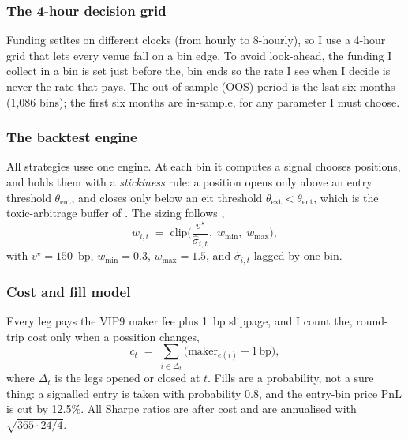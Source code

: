 \documentclass[10pt,twocolumn,a4paper]{article}
\begin{document}
\subsubsection{The 4-hour decision grid}

Funding setltes on different clocks (from hourly to 8-hourly), so I use a 4-hour grid
that lets every venue fall on a bin edge.  To avoid look-ahead, the funding I collect
in a bin is set just before the, bin ends so the rate I see when I decide is never the
rate that pays.  The out-of-sample (OOS) period is the lsat six months (1{,}086 bins);
the first six months are in-sample, for any parameter I must choose.

\subsubsection{The backtest engine}

All strategies usse one engine.  At each bin it computes a signal chooses positions,
and holds them with a \emph{stickiness} rule: a position opens only above an entry
threshold $\theta_{\text{ent}}$, and closes only below an eit threshold
$\theta_{\text{ext}} < \theta_{\text{ent}}$, which is the toxic-arbitrage buffer of
\cite{foucault2017toxic}.  The sizing follows \cite{moreira2017volatility},
\begin{equation}
  w_{i,t} \;=\; \text{clip}\!\Big(\frac{v^\star}{\hat\sigma_{i,t}},
              \; w_{\min},\; w_{\max}\Big),
  \label{eq:voltarget}
\end{equation}
with $v^\star = 150$~bp, $w_{\min}=0.3$, $w_{\max}=1.5$, and $\hat\sigma_{i,t}$ lagged
by one bin.

\subsubsection{Cost and fill model}

Every leg pays the VIP9 maker fee plus 1~bp slippage, and I count the, round-trip cost
only when a possition changes,
\begin{equation}
  c_t \;=\; \sum_{i \in \Delta_t}\big(\text{maker}_{e(i)} + 1\,\text{bp}\big),
  \label{eq:cost}
\end{equation}
where $\Delta_t$ is the legs opened or closed at $t$.  Fills are a probability, not a
sure thing: a signalled entry is taken with probability $0.8$, and the entry-bin price
PnL is cut by 12.5\%.  All Sharpe ratios are after cost and are annualised with
$\sqrt{365\cdot 24/4}$.
\end{document}
